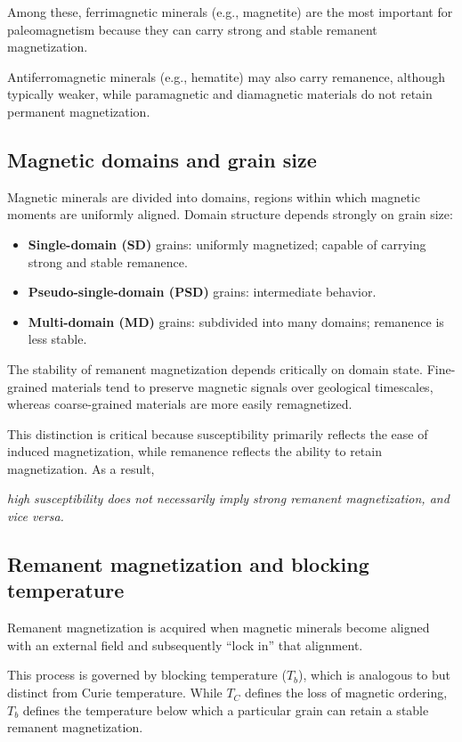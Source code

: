 Among these, ferrimagnetic minerals (e.g., magnetite) are the most important for paleomagnetism because they can carry strong and stable remanent magnetization.

Antiferromagnetic minerals (e.g., hematite) may also carry remanence, although typically weaker, while paramagnetic and diamagnetic materials do not retain permanent magnetization.

\subsection{Magnetic domains and grain size}

Magnetic minerals are divided into domains, regions within which magnetic moments are uniformly aligned. Domain structure depends strongly on grain size:

\begin{itemize}
    \item \textbf{Single-domain (SD)} grains: uniformly magnetized; capable of carrying strong and stable remanence.
    \item \textbf{Pseudo-single-domain (PSD)} grains: intermediate behavior.
    \item \textbf{Multi-domain (MD)} grains: subdivided into many domains; remanence is less stable.
\end{itemize}

The stability of remanent magnetization depends critically on domain state. Fine-grained materials tend to preserve magnetic signals over geological timescales, whereas coarse-grained materials are more easily remagnetized.

This distinction is critical because susceptibility primarily reflects the ease of induced magnetization, while remanence reflects the ability to retain magnetization. As a result,
\begin{center}
\emph{high susceptibility does not necessarily imply strong remanent magnetization, and vice versa.}
\end{center}

\subsection{Remanent magnetization and blocking temperature}

Remanent magnetization is acquired when magnetic minerals become aligned with an external field and subsequently ``lock in'' that alignment.

This process is governed by blocking temperature ($T_b$), which is analogous to but distinct from Curie temperature. While $T_C$ defines the loss of magnetic ordering, $T_b$ defines the temperature below which a particular grain can retain a stable remanent magnetization.


